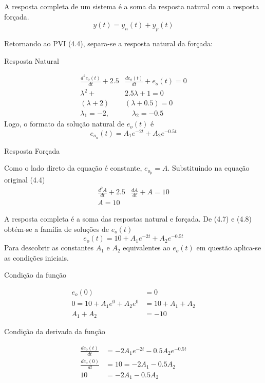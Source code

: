 \documentclass{article}
\numberwithin{equation}{section}
\begin{document}
A resposta completa de um sistema é a soma da resposta natural com a resposta forçada. $$y(t)=y_n(t)+y_p(t)$$

\noindent Retornando ao PVI (4.4), separa-se a resposta natural da forçada:
\begin{center}{Resposta Natural}\end{center}
\begin{align*}
    \frac{ d^2e_{o}(t) }{ dt } + 2.5& \frac{ de_{o}(t) }{ dt } + e_{o}(t) = 0 \\
    \lambda^{2} +& 2.5\lambda + 1 = 0 \\
    (\lambda+2)&(\lambda+0.5) = 0 \\
    \lambda_{1}=-2,& \quad \lambda_{2}=-0.5
\end{align*}
Logo, o formato da solução natural de $e_{o}(t)$ é
\begin{equation}
    e_{o_n}(t) = A_{1}e^{-2t}+A_{2}e^{-0.5t}
\end{equation}
\vspace{0.1cm}
\begin{center}{Resposta Forçada}\end{center}
Como o lado direto da equação é constante, $e_{o_p} = A$. Substituindo na equação original (4.4)
\begin{align}
    \frac{ d^2 A }{ dt } + 2.5& \frac{ d A }{ dt } + A = 10\nonumber \\
    A = 10
\end{align}

A resposta completa é a soma das respostas natural e forçada. De (4.7) e (4.8) obtém-se a família de soluções de $e_{o}(t)$
\begin{equation*}
    e_{o}(t) = 10 + A_{1}e^{-2t}+A_{2}e^{-0.5t}
\end{equation*}
Para descobrir as constantes $A_{1}$ e $A_{2}$ equivalentes ao $e_{o}(t)$ em questão aplica-se as condições iniciais.
\begin{center}{Condição da função}\end{center}
\begin{align}
    e_{o}(0) &= 0 \nonumber \\
    0 = 10 + A_{1}e^{0}+A_{2}e^{0} &= 10 + A_{1} + A_{2} \nonumber \\
    A_{1} + A_{2} &= -10
\end{align}

\begin{center}{Condição da derivada da função}\end{center}
\begin{align}
    \frac{de_{o}(t)}{dt} &= -2A_{1}e^{-2t}-0.5A_{2}e^{-0.5t} \nonumber \\
    \frac{de_{o}(0)}{dt} &= 10 = -2A_{1}-0.5A_{2} \nonumber \\
    10 &= -2A_{1}-0.5A_{2}
\end{align}
\end{document}
